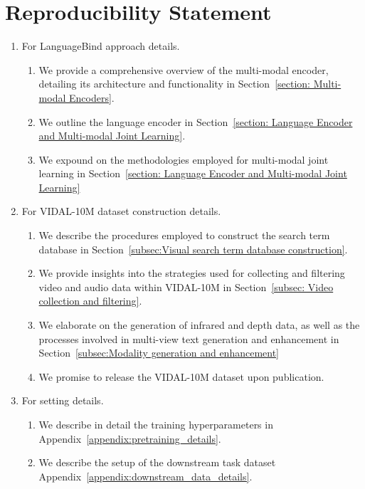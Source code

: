 \documentclass{article} \usepackage{iclr2024_conference,times}
\begin{document}
\section*{Reproducibility Statement}
\begin{enumerate}

\item  For LanguageBind approach details.
\begin{enumerate}
    \item  We provide a comprehensive overview of the multi-modal encoder, detailing its architecture and functionality in Section~\ref{section: Multi-modal Encoders}. \item  We outline the language encoder in Section~\ref{section: Language Encoder and Multi-modal Joint Learning}.
    \item We expound on the methodologies employed for multi-modal joint learning in Section~\ref{section: Language Encoder and Multi-modal Joint Learning}
\end{enumerate}

\item  For VIDAL-10M dataset construction details.
\begin{enumerate}
    \item  We describe the procedures employed to construct the search term database in Section~\ref{subsec:Visual search term database construction}. \item  We provide insights into the strategies used for collecting and filtering video and audio data within VIDAL-10M in Section~\ref{subsec: Video collection and filtering}.
    \item We elaborate on the generation of infrared and depth data, as well as the processes involved in multi-view text generation and enhancement in Section~\ref{subsec:Modality generation and enhancement}
    \item  We promise to release the VIDAL-10M dataset upon publication.
\end{enumerate}

\item  For setting details.
\begin{enumerate}
    \item  We describe in detail the training hyperparameters in Appendix~\ref{appendix:pretraining_details}. \item  We describe the setup of the downstream task dataset Appendix~\ref{appendix:downstream_data_details}. \end{enumerate}


\end{enumerate}
\end{document}
